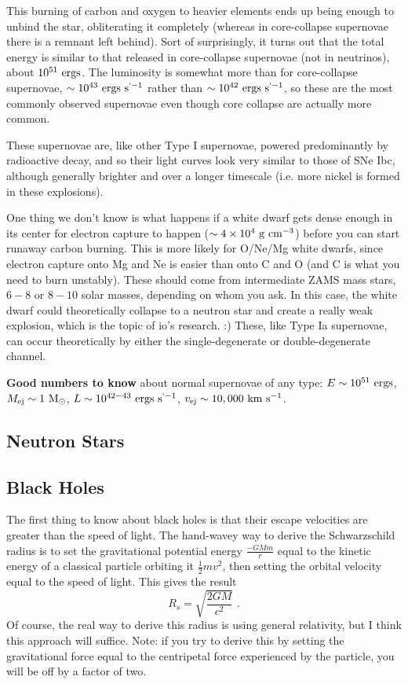 This burning of carbon and oxygen to heavier elements ends up being enough to unbind the star, obliterating it completely (whereas in core-collapse supernovae there is a remnant left behind). Sort of surprisingly, it turns out that the total energy is similar to that released in core-collapse supernovae (not in neutrinos), about $10^{51}~{\rm ergs}$. The luminosity is somewhat more than for core-collapse supernovae, $\sim10^{43}~{\rm ergs}~{\rm s}^{`-1}$ rather than $\sim10^{42}~{\rm ergs}~{\rm s}^{`-1}$, so these are the most commonly observed supernovae even though core collapse are actually more common.

These supernovae are, like other Type I supernovae, powered predominantly by radioactive decay, and so their light curves look very similar to those of SNe Ibc, although generally brighter and over a longer timescale (i.e. more nickel is formed in these explosions).

One thing we don't know is what happens if a white dwarf gets dense enough in its center for electron capture to happen ($\sim 4\times 10^4~{\rm g}~{\rm cm}^{-3}$) before you can start runaway carbon burning. This is more likely for O/Ne/Mg white dwarfs, since electron capture onto Mg and Ne is easier than onto C and O (and C is what you need to burn unstably). These should come from intermediate ZAMS mass stars, $6-8$ or $8-10$ solar masses, depending on whom you ask. In this case, the white dwarf could theoretically collapse to a neutron star and create a really weak explosion, which is the topic of io's research. :) These, like Type Ia supernovae, can occur theoretically by either the single-degenerate or double-degenerate channel.

\textbf{Good numbers to know} about normal supernovae of any type: $E \sim 10^{51}~{\rm ergs}$, $M_{\rm ej} \sim 1~{\rm M}_\odot$, $L \sim 10^{42-43}~{\rm ergs}~{\rm s}^{`-1}$, $v_{\rm ej} \sim 10,000~{\rm km}~{\rm s}^{-1}$.

\subsection{Neutron Stars}

\subsection{Black Holes}

The first thing to know about black holes is that their escape velocities are greater than the speed of light. The hand-wavey way to derive the Schwarzschild radius is to set the gravitational potential energy $\frac{-G Mm}{r}$ equal to the kinetic energy of a classical particle orbiting it $\frac{1}{2}m v^2$, then setting the orbital velocity equal to the speed of light. This gives the result
\begin{equation}
R_s = \sqrt{\frac{2GM}{c^2}}\,\,.
\end{equation}
Of course, the real way to derive this radius is using general relativity, but I think this approach will suffice. Note: if you try to derive this by setting the gravitational force equal to the centripetal force experienced by the particle, you will be off by a factor of two.

